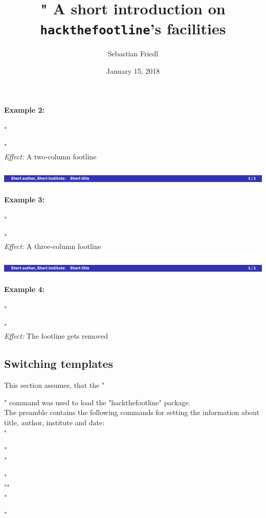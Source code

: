 \documentclass[11pt]{ltxdoc}
\begin{document}
	
	\paragraph{Example 2:}
	"\usepackage[twocols]{hackthefootline}" \\
	\textit{Effect:} A two-column footline \\
	\includegraphics[page=2, width=\textwidth, trim=0 0 0 15, clip]{hackthefootline-examples}
	
	\paragraph{Example 3:}
	"\usepackage[threecols]{hackthefootline}" \\
	\textit{Effect:} A three-column footline \\
	\includegraphics[page=3, width=\textwidth, trim=0 0 0 15, clip]{hackthefootline-examples}
	
	\paragraph{Example 4:}
	"\usepackage{hackthefootline}" \\
	\textit{Effect:} The footline gets removed
	
	
	\subsection{Switching templates}\label{examples-switchtemplates}
	This section assumes, that the "\usepackage[twocols]{hackthefootline}" command was used to load the "hackthefootline" package. \\[\medskipamount]
	The preamble contains the following commands for setting the information about title, author, institute and date: \\[\smallskipamount]
	"\title[Short Introduction]{%
	"    A short introduction on \texttt{hackthefootline}'s facilities}" \\
	"\author[S. Friedl]{Sebastian Friedl}" \\
	"" \\
	"\date[2018/01/15]{January 15, 2018}"
	
\end{document}
